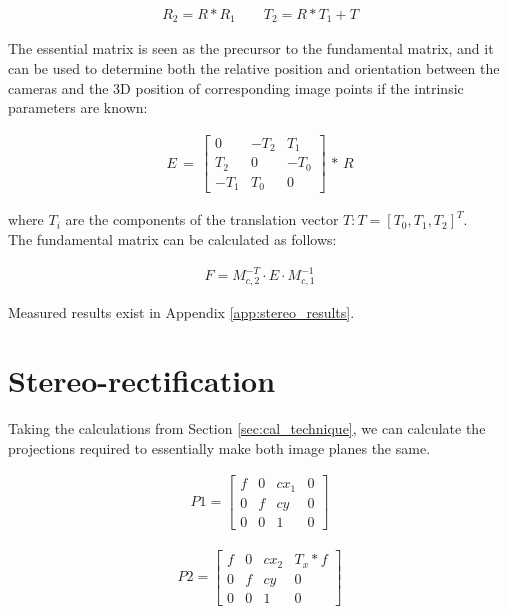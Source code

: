 \begin{align*}R_2=R*R_1\quad\quad T_2=R*T_1 + T \end{align*}

The essential matrix is seen as the precursor to the fundamental matrix, and it can be used to determine both the relative position and orientation between the cameras and the 3D position of corresponding image points if the intrinsic parameters are known:

\begin{align*}
E\,=\,\begin{bmatrix}
{0} & {-T_2} & {T_1}\\
{T_2} & {0} & {-T_0}\\
{-T_1} & {T_0} & {0} 
\end{bmatrix}\,*\,R
\end{align*}

where $T_i$ are the components of the translation vector $T : T=[T_0, T_1, T_2]^T$.\\

The fundamental matrix can be calculated as follows:

\begin{align*}
F = M_{c,2}^{-T}\cdot E\cdot M_{c,1}^{-1} 
\end{align*}

Measured results exist in Appendix \ref{app:stereo_results}.

\section{Stereo-rectification}

Taking the calculations from Section \ref{sec:cal_technique}, we can calculate the projections required to essentially make  both image planes the same.

\begin{align*}
P1 = \begin{bmatrix} f & 0 & cx_1 & 0 \\ 0 & f & cy & 0 \\ 0 & 0 & 1 & 0 \end{bmatrix}
\end{align*}

\begin{align*}
P2 = \begin{bmatrix} f & 0 & cx_2 & T_x*f \\ 0 & f & cy & 0 \\ 0 & 0 & 1 & 0 \end{bmatrix}
\end{align*}

